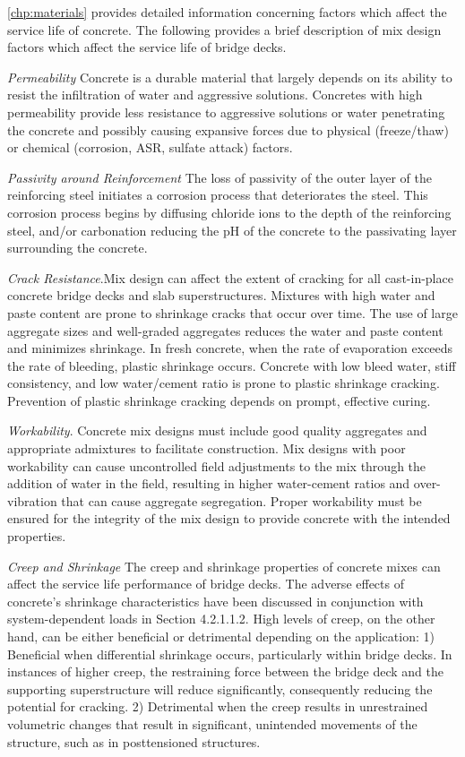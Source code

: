 \cref{chp:materials} provides detailed information concerning factors which affect the service life of concrete. The
following provides a brief description of mix design factors which affect the service life of bridge decks.

\emph{Permeability} Concrete is a durable material that largely depends on its ability to resist the infiltration of water and
aggressive solutions. Concretes with high permeability provide less resistance to aggressive solutions or water
penetrating the concrete and possibly causing expansive forces due to physical (freeze/thaw) or chemical (corrosion,
ASR, sulfate attack) factors.

\emph{Passivity around Reinforcement} The loss of passivity of the outer layer of the reinforcing steel initiates a corrosion
process that deteriorates the steel. This corrosion process begins by diffusing chloride ions to the depth of the
reinforcing steel, and/or carbonation reducing the pH of the concrete to the passivating layer surrounding the
concrete.

\emph{Crack Resistance}.Mix design can affect the extent of cracking for all cast-in-place concrete bridge decks and slab
superstructures. Mixtures with high water and paste content are prone to shrinkage cracks that occur over time. The
use of large aggregate sizes and well-graded aggregates reduces the water and paste content and minimizes
shrinkage. In fresh concrete, when the rate of evaporation exceeds the rate of bleeding, plastic shrinkage occurs. Concrete with low bleed water, stiff consistency, and low water/cement ratio is prone to plastic shrinkage cracking.
Prevention of plastic shrinkage cracking depends on prompt, effective curing.

\emph{Workability}. Concrete mix designs must include good quality aggregates and appropriate admixtures to facilitate
construction. Mix designs with poor workability can cause uncontrolled field adjustments to the mix through the
addition of water in the field, resulting in higher water-cement ratios and over-vibration that can cause aggregate
segregation. Proper workability must be ensured for the integrity of the mix design to provide concrete with the
intended properties.

\emph{Creep and Shrinkage} The creep and shrinkage properties of concrete mixes can affect the service life performance
of bridge decks. The adverse effects of concrete’s shrinkage characteristics have been discussed in conjunction with
system-dependent loads in Section 4.2.1.1.2. High levels of creep, on the other hand, can be either beneficial or
detrimental depending on the application: 1) Beneficial when differential shrinkage occurs, particularly within bridge
decks. In instances of higher creep, the restraining force between the bridge deck and the supporting superstructure
will reduce significantly, consequently reducing the potential for cracking. 2) Detrimental when the creep results in
unrestrained volumetric changes that result in significant, unintended movements of the structure, such as in
posttensioned structures.


